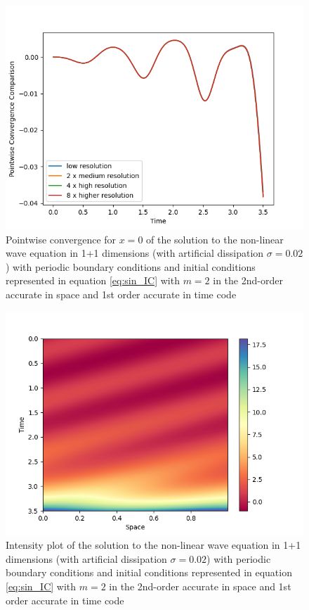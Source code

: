 \begin{figure}[t!]
    \centering
    \includegraphics[width=\columnwidth]{Images/non_linear_simple_wave-2nd-point-diss.png}
    \caption{Pointwise convergence for $x = 0$ of the solution to the non-linear wave equation in 1+1 dimensions (with artificial dissipation $\sigma = 0.02$) with periodic boundary conditions and initial conditions represented in equation \eqref{eq:sin_IC} with $m = 2$ in the 2nd-order accurate in space and 1st order accurate in time code}
    \label{fig:point_non_linear_simple_wave_2nd_order-diss}
\end{figure}

\begin{figure}[t!]
    \centering
    \includegraphics[width=\columnwidth]{Images/non_linear_wave-2nd_order-Intensity.png}
    \caption{Intensity plot of the solution to the non-linear wave equation in 1+1 dimensions (with artificial dissipation $\sigma = 0.02$) with periodic boundary conditions and initial conditions represented in equation \eqref{eq:sin_IC} with $m = 2$ in the 2nd-order accurate in space and 1st order accurate in time code}
    \label{fig:intensity_non_linear_simple_wave_2nd_order}
\end{figure}

